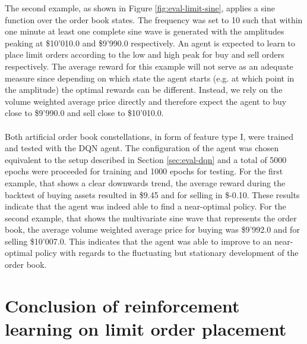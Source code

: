 The second example, as shown in Figure \ref{fig:eval-limit-sine}, applies a sine function over the order book states.
The frequency was set to 10 such that within one minute at least one complete sine wave is generated with the amplitudes peaking at \$10'010.0 and \$9'990.0 respectively.
An agent is expected to learn to place limit orders according to the low and high peak for buy and sell orders respectively.
The average reward for this example will not serve as an adequate measure since depending on which state the agent starts (e.g. at which point in the amplitude) the optimal rewards can be different.
Instead, we rely on the volume weighted average price directly and therefore expect the agent to buy close to \$9'990.0 and sell close to \$10'010.0.
\\
\\
Both artificial order book constellations, in form of feature type I, were trained and tested with the DQN agent.
The configuration of the agent was chosen equivalent to the setup described in Section \ref{sec:eval-dqn} and a total of 5000 epochs were proceeded for training and 1000 epochs for testing.
For the first example, that shows a clear downwards trend, the average reward during the backtest of buying assets resulted in \$9.45 and for selling in \$-0.10.
These results indicate that the agent was indeed able to find a near-optimal policy.
For the second example, that shows the multivariate sine wave that represents the order book, the average volume weighted average price for buying was \$9'992.0 and for selling \$10'007.0.
This indicates that the agent was able to improve to an near-optimal policy with regards to the fluctuating but stationary development of the order book.

\section{Conclusion of reinforcement learning on limit order placement}

